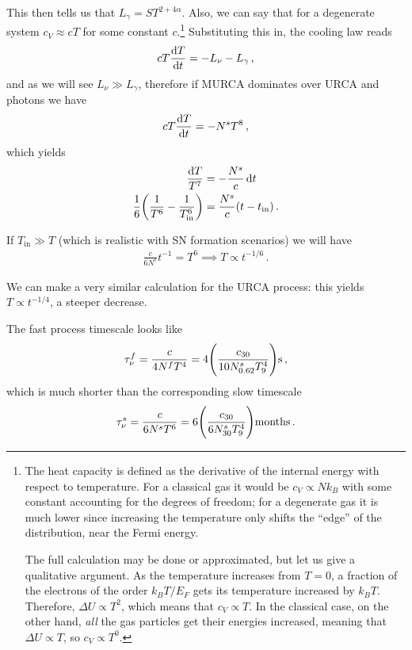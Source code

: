 \documentclass[main.tex]{subfiles}
\begin{document}
This then tells us that \(L_\gamma = S T^{2 + 4 \alpha }\). 
Also, we can say that for a degenerate system \(c_V \approx c T\) for some constant \(c\).\footnote{The heat capacity is defined as the derivative of the internal energy with respect to temperature. For a classical gas it would be \(c_V \propto N k_B\) with some constant accounting for the degrees of freedom; for a degenerate gas it is much lower since increasing the temperature only shifts the ``edge'' of the distribution, near the Fermi energy. 

The full calculation may be done or approximated, but let us give a qualitative argument. As the temperature increases from \(T = 0\), a fraction of the electrons of the order \(k_B T / E_F\) gets its temperature increased by \(k_B T\). Therefore, \(\Delta U \propto T^2\), which means that \(c_V \propto T\). In the classical case, on the other hand, \emph{all} the gas particles get their energies increased, meaning that \(\Delta U \propto T\), so \(c_V \propto T^{0}\).}
Substituting this in, the cooling law reads 
%
\begin{align}
c T \dv{T}{t} = - L_\nu - L_\gamma 
\,,
\end{align}
%
and as we will see \(L_\nu \gg  L_\gamma \), therefore if MURCA dominates over URCA and photons we have 
%
\begin{align}
cT \dv{T}{t} = - N^{s} T^{8}
\,,
\end{align}
%
which yields 
%
\begin{align}
\frac{ \dd{T}}{T^{7}} &= - \frac{N^{s}}{c} \dd{t}  \\
\frac{1}{6} \qty( \frac{1}{T^{6}} - \frac{1}{T _{\text{in}}^{6}}) &= \frac{N^{s}}{c} (t - t _{\text{in}})
\,.
\end{align}

If \(T _{\text{in}} \gg T\) (which is realistic with SN formation scenarios) we will have 
%
\begin{align}
\frac{c}{6 N^{s}} t^{-1} = T^{6} \implies T \propto t^{-1/6}
\,.
\end{align}

We can make a very similar calculation for the URCA process: this yields  \(T \propto t^{-1/4}\), a steeper decrease. 

The fast process timescale looks like 
%
\begin{align}
\tau^f_\nu = \frac{c}{4 N^{f} T^{4}} = 4 \qty(\frac{c_{30}}{10 N^{s}_{\num{.62}} T^{4}_9}) \SI{}{s}
\,,
\end{align}
%
which is much shorter than the corresponding slow timescale 
%
\begin{align}
\tau^s_\nu = \frac{c}{6 N^{s} T^{6}}  = 6 \qty(\frac{c_{30}}{6 N_{30}^{s} T^{4}_9}) \SI{}{months}
\,.
\end{align}
\end{document}
